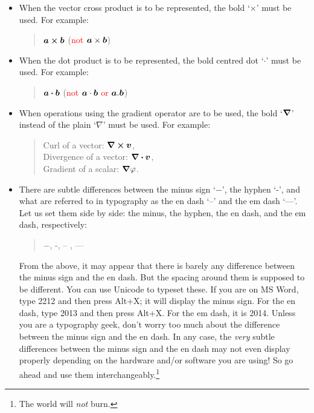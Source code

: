 \begin{itemize}
\item When the vector cross product is to be represented, the bold `$\boldsymbol{\times}$' must be used. For example:
\begin{quote}
$\vectorsym{a} \boldsymbol{\times} \vectorsym{b}$ \quad (\textcolor{red}{not $\vectorsym{a} \times \vectorsym{b}$})
\end{quote}


\item When the dot product is to be represented, the bold centred dot `$\boldsymbol{\cdot}$' must be used. For example:
\begin{quote}
$\vectorsym{a} \boldsymbol{\cdot} \vectorsym{b}$ \quad (\textcolor{red}{not $\vectorsym{a} \cdot \vectorsym{b}$ or $\vectorsym{a} . \vectorsym{b}$})
\end{quote}

\item When operations using the gradient operator are to be used, the bold `$\boldsymbol{\nabla}$' instead of the plain `$\nabla$' must be used. For example:
\begin{quote}
Curl of a vector: $\bs{\nabla} \bs{\times} \vectorsym{v}$, \\
Divergence of a vector: $\bs{\nabla} \bs{\cdot} \vectorsym{v}$, \\
Gradient of a scalar: $\boldsymbol{\nabla} \varphi$.
\end{quote}


\item There are subtle differences between the minus sign `$-$', the hyphen `-', and what are referred to in typography as the en dash `--' and the em dash `---'. Let us set them side by side: the minus, the hyphen, the en dash, and the em dash, respectively:
\begin{quote}
$-$, -, -- , ---
\end{quote}
From the above, it may appear that there is barely any difference between the minus sign and the en dash. But the spacing around them is supposed to be different. You can use Unicode to typeset these. If you are on MS Word, type 2212 and then press Alt+X; it will display the minus sign. For the en dash, type 2013 and then press Alt+X. For the em dash, it is 2014. Unless you are a typography geek, don't worry too much about the difference between the minus sign and the en dash. In any case, the {\em very} subtle differences between the minus sign and the en dash may not even display properly depending on the hardware and/or software you are using! So go ahead and use them interchangeably.\footnote{The world will {\em not} burn.}



\end{itemize}
